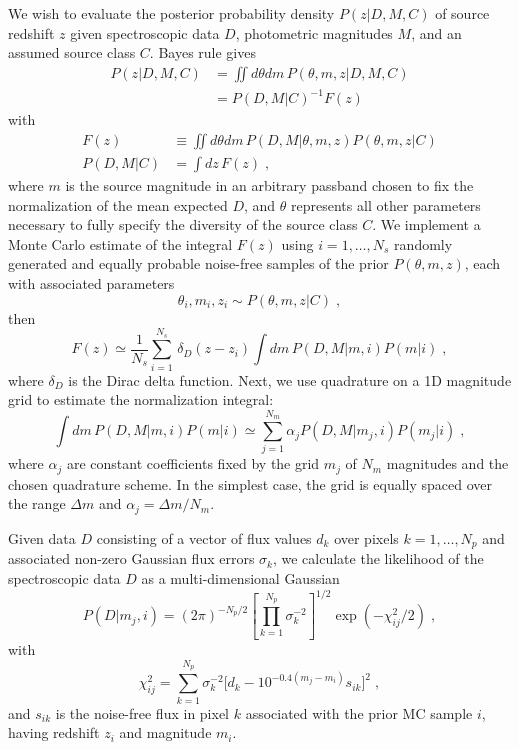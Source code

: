 \documentclass[11pt]{article}
\begin{document}
We wish to evaluate the posterior probability density $P(z|D,M,C)$ of source redshift $z$ given spectroscopic data $D$, photometric magnitudes $M$, and an assumed source class $C$. Bayes rule gives
\begin{align}
P(z|D, M, C) &= \iint d\theta dm \, P(\theta, m, z | D, M, C) \\
&= P(D,M|C)^{-1} F(z)
\end{align}
with
\begin{align}
F(z) &\equiv \iint d\theta dm \, P(D,M|\theta, m, z) P(\theta, m, z| C) \\
P(D,M|C) &= \int dz\, F(z) \;,
\end{align}
where $m$ is the source magnitude in an arbitrary passband chosen to fix the normalization of the mean expected $D$, and $\theta$ represents all other parameters necessary to fully specify the diversity of the source class $C$.  We implement a Monte Carlo estimate of the integral $F(z)$ using $i = 1, \ldots, N_s$ randomly generated and equally probable noise-free samples of the prior $P(\theta, m, z)$, each with associated parameters 
\begin{equation}
\theta_i, m_i, z_i \sim P(\theta, m, z| C) \; ,
\end{equation}
then
\begin{equation}
F(z) \simeq \frac{1}{N_s} \sum_{i=1}^{N_s}\, \delta_D(z - z_i) \int dm\, P(D, M|m, i) P(m|i) \; ,
\end{equation}
where $\delta_D$ is the Dirac delta function. Next, we use quadrature on a 1D magnitude grid to estimate the normalization integral:
\begin{equation}
\int dm\, P(D, M|m, i) P(m|i) \simeq \sum_{j=1}^{N_m} \alpha_j P(D, M|m_j, i) P(m_j|i) \;,
\end{equation}
where $\alpha_j$ are constant coefficients fixed by the grid $m_j$ of $N_m$ magnitudes and the chosen quadrature scheme.  In the simplest case, the grid is equally spaced over the range $\Delta m$ and $\alpha_j = \Delta m / N_m$.

Given data $D$ consisting of a vector of flux values $d_k$ over pixels $k=1,\ldots,N_p$ and associated non-zero Gaussian flux errors $\sigma_k$, we calculate the likelihood of the spectroscopic data $D$ as a multi-dimensional Gaussian
\begin{equation}
P(D|m_j, i) = (2\pi)^{-{N_p}/2} \left[\prod_{k=1}^{N_p} \sigma_k^{-2}\right]^{1/2} \exp(-\chi^2_{ij}/2) \; ,
\end{equation}
with
\begin{equation}
\chi^2_{ij} = \sum_{k=1}^{N_p} \sigma_k^{-2} \bigl[ d_k - 10^{-0.4(m_j - m_i)} s_{ik} \bigr]^2 \; ,
\end{equation}
and $s_{ik}$ is the noise-free flux in pixel $k$ associated with the prior MC sample $i$, having redshift $z_i$ and magnitude $m_i$.
\end{document}
